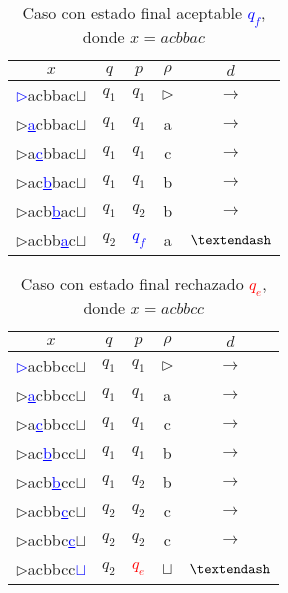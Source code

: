 \documentclass[letterpaper,11pt]{article}
\begin{document}
\begin{table}[h!]
\centering
\begin{tabular}{c|c|c|c|c}
\hline
$x$ & $q$ & $p$ & $\rho$ & $d$ \\ \hline
\textcolor{blue}{\underline{$\rhd$}}acbbac$\sqcup$  & $q_1$ & $q_1$ & $\rhd$ & $\rightarrow$  \\
$\rhd$\textcolor{blue}{\underline{a}}cbbac$\sqcup$  & $q_1$ & $q_1$ & a & $\rightarrow$  \\
$\rhd$a\textcolor{blue}{\underline{c}}bbac$\sqcup$  & $q_1$ & $q_1$ & c & $\rightarrow$  \\
$\rhd$ac\textcolor{blue}{\underline{b}}bac$\sqcup$  & $q_1$ & $q_1$ & b & $\rightarrow$  \\
$\rhd$acb\textcolor{blue}{\underline{b}}ac$\sqcup$  & $q_1$ & $q_2$ & b & $\rightarrow$  \\
$\rhd$acbb\textcolor{blue}{\underline{a}}c$\sqcup$  & $q_2$ & \textcolor{blue}{$q_f$} & a & $\textendash$  \\\hline
\end{tabular}
\caption{Caso con estado final aceptable \textcolor{blue}{$q_f$}, donde $x=acbbac$}
\end{table}

\begin{table}[h!]
\centering
\begin{tabular}{c|c|c|c|c}
\hline
$x$ & $q$ & $p$ & $\rho$ & $d$ \\ \hline
\textcolor{blue}{\underline{$\rhd$}}acbbcc$\sqcup$  & $q_1$ & $q_1$ & $\rhd$ & $\rightarrow$  \\
$\rhd$\textcolor{blue}{\underline{a}}cbbcc$\sqcup$  & $q_1$ & $q_1$ & a & $\rightarrow$  \\
$\rhd$a\textcolor{blue}{\underline{c}}bbcc$\sqcup$  & $q_1$ & $q_1$ & c & $\rightarrow$  \\
$\rhd$ac\textcolor{blue}{\underline{b}}bcc$\sqcup$  & $q_1$ & $q_1$ & b & $\rightarrow$  \\
$\rhd$acb\textcolor{blue}{\underline{b}}cc$\sqcup$  & $q_1$ & $q_2$ & b & $\rightarrow$  \\
$\rhd$acbb\textcolor{blue}{\underline{c}}c$\sqcup$  & $q_2$ & $q_2$ & c & $\rightarrow$  \\
$\rhd$acbbc\textcolor{blue}{\underline{c}}$\sqcup$  & $q_2$ & $q_2$ & c & $\rightarrow$  \\
$\rhd$acbbcc\textcolor{blue}{\underline{$\sqcup$}}  & $q_2$ & \textcolor{red}{$q_e$} & $\sqcup$ & $\textendash$  \\\hline
\end{tabular}
\caption{Caso con estado final rechazado \textcolor{red}{$q_e$}, donde $x=acbbcc$}
\end{table}
\end{document}
